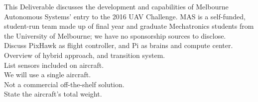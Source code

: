 \label{sec:intro}
This Deliverable discusses the development and capabilities of Melbourne Autonomous Systems' entry to the 2016 UAV Challenge. MAS is a self-funded, student-run team made up of final year and graduate Mechatronics students from the University of Melbourne; we have no sponsorship sources to disclose.\\

Discuss PixHawk as flight controller, and Pi as brains and compute center.\\

Overview of hybrid approach, and transition system.\\

List sensors included on aircraft.\\

We will use a single aircraft.\\

Not a commercial off-the-shelf solution.\\

State the aircraft's total weight.\\